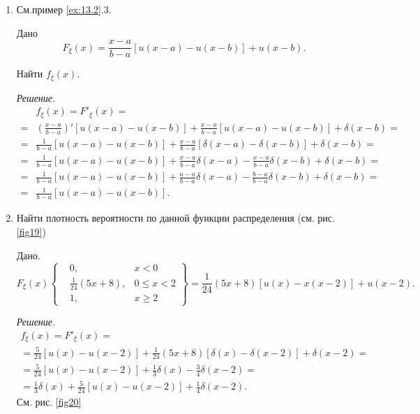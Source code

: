 \begin{example}\-
\label{ex:13.6}
\begin{enumerate}[leftmargin=1.1em]
	\item См.пример \ref{ex:13.2}.3. 

	Дано
	\begin{equation*}
		F_{\xi}(x)=\frac{x-a}{b-a}[u(x-a)-u(x-b)]+u(x-b).
	\end{equation*}

	Найти $f_{\xi}(x)$.

	\textit{Решение.}
	\begin{equation*}
	\begin{split}
		&f_{\xi}(x)=F'_{\xi}(x)=\\=
		&\left(\frac{x-a}{b-a}\right)'[u(x-a)-u(x-b)]+
		\frac{x-a}{b-a}\left[u(x-a)-u(x-b)\right]+\delta(x-b)=\\=
		&\frac{1}{b-a}[u(x-a)-u(x-b)]+\frac{x-a}{b-a}[\delta(x-a)-\delta(x-b)]+
		\delta(x-b)=\\=
		&\frac{1}{b-a}[u(x-a)-u(x-b)]+\frac{x-a}{b-a}\delta(x-a)
		-\frac{x-a}{b-a}\delta(x-b)+\delta(x-b)=\\=
		&\frac{1}{b-a}[u(x-a)-u(x-b)]+\frac{a-a}{b-a}\delta(x-a)-\frac{b-a}{b-a}\delta(x-b)+\delta(x-b)=\\=
		&\frac{1}{b-a}[u(x-a)-u(x-b)].
	\end{split}
	\end{equation*}
	\item Найти плотность вероятности по данной функции распределения
	(см. рис. \ref{fig19})
	
	Дано.
	\begin{equation*}
		F_{\xi}(x)
		\left\{\begin{aligned}
			&0, &x<0 \\
			&\frac{1}{24}(5x+8), &0\leqslant x<2 \\
			&1, &x\geqslant 2
		\end{aligned}\right\}
		=\frac{1}{24}(5x+8)[u(x)-x(x-2)]+u(x-2).
	\end{equation*}

	\textit{Решение.}
	\begin{gather*}
		f_{\xi}(x)=F'_{\xi}(x)=\\=
		\frac{5}{24}[u(x)-u(x-2)]+\frac{1}{24}(5x+8)[\delta(x)-\delta(x-2)]+\delta(x-2)=\\=
		\frac{5}{24}[u(x)-u(x-2)]+\frac{1}{3}\delta(x)-\frac{3}{4}\delta(x-2)=\\=
		\frac{1}{3}\delta(x)+\frac{5}{24}[u(x)-u(x-2)]+\frac{1}{4}\delta(x-2).
	\end{gather*}
	См. рис. \ref{fig20}
\end{enumerate}
\end{example}

